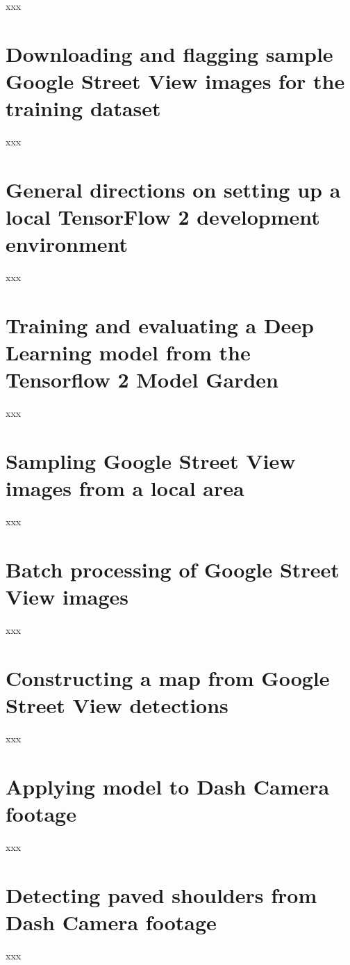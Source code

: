 \documentclass[11pt,twoside]{report}
\begin{document}
xxx

\chapter{Downloading and flagging sample Google Street View images for the training dataset}
\label{a:download_gsv}

xxx

\chapter{General directions on setting up a local TensorFlow 2 development environment}
\label{a:setupenv}

xxx

\chapter{Training and evaluating a Deep Learning model from the Tensorflow 2 Model Garden}
\label{a:tensorflow_training}

xxx

\chapter{Sampling Google Street View images from a local area}
\label{a:sample_area1}

xxx

\chapter{Batch processing of Google Street View images}
\label{a:gsv_batch}

xxx

\chapter{Constructing a map from Google Street View detections}
\label{a:gsv_map}

xxx

\chapter{Applying model to Dash Camera footage}
\label{a:apply_dashcam}

xxx

\chapter{Detecting paved shoulders from Dash Camera footage}
\label{a:lane_detection}

xxx

\cleardoublepage


\end{document}
